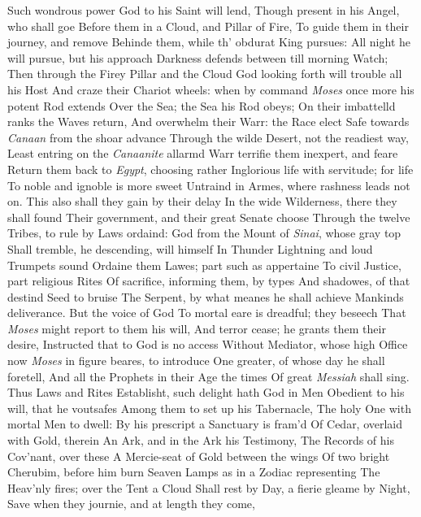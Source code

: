 \documentclass[11pt]{book}
\begin{document}
Such wondrous power God to his Saint will lend, 
Though present in his Angel, who shall goe 
Before them in a Cloud, and Pillar of Fire, 
To guide them in their journey, and remove 
Behinde them, while th' obdurat King pursues: 
All night he will pursue, but his approach 
Darkness defends between till morning Watch; 
Then through the Firey Pillar and the Cloud 
God looking forth will trouble all his Host 
And craze their Chariot wheels: when by command 
\textit{Moses} once more his potent Rod extends 
Over the Sea; the Sea his Rod obeys; 
On their imbattelld ranks the Waves return, 
And overwhelm their Warr: the Race elect 
Safe towards \textit{Canaan} from the shoar advance 
Through the wilde Desert, not the readiest way, 
Least entring on the \textit{Canaanite} allarmd 
Warr terrifie them inexpert, and feare 
Return them back to \textit{Egypt}, choosing rather 
Inglorious life with servitude; for life 
To noble and ignoble is more sweet 
Untraind in Armes, where rashness leads not on. 
This also shall they gain by their delay 
In the wide Wilderness, there they shall found 
Their government, and their great Senate choose 
Through the twelve Tribes, to rule by Laws ordaind: 
God from the Mount of \textit{Sinai}, whose gray top 
Shall tremble, he descending, will himself 
In Thunder Lightning and loud Trumpets sound 
Ordaine them Lawes; part such as appertaine 
To civil Justice, part religious Rites 
Of sacrifice, informing them, by types 
And shadowes, of that destind Seed to bruise 
The Serpent, by what meanes he shall achieve 
Mankinds deliverance.  But the voice of God 
To mortal eare is dreadful; they beseech 
That \textit{Moses} might report to them his will, 
And terror cease; he grants them their desire, 
Instructed that to God is no access 
Without Mediator, whose high Office now 
\textit{Moses} in figure beares, to introduce 
One greater, of whose day he shall foretell, 
And all the Prophets in their Age the times 
Of great \textit{Messiah} shall sing.  Thus Laws and Rites 
Establisht, such delight hath God in Men 
Obedient to his will, that he voutsafes 
Among them to set up his Tabernacle, 
The holy One with mortal Men to dwell: 
By his prescript a Sanctuary is fram'd 
Of Cedar, overlaid with Gold, therein 
An Ark, and in the Ark his Testimony, 
The Records of his Cov'nant, over these 
A Mercie-seat of Gold between the wings 
Of two bright Cherubim, before him burn 
Seaven Lamps as in a Zodiac representing 
The Heav'nly fires; over the Tent a Cloud 
Shall rest by Day, a fierie gleame by Night, 
Save when they journie, and at length they come, 
\end{document}
